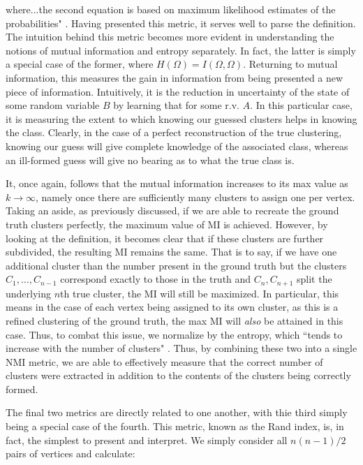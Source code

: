 \documentclass{article}
\begin{document}
where...the second equation is based on maximum likelihood estimates of the probabilities" \cite{evaluation}. Having presented this metric, it serves well to parse the definition. The intuition behind this metric becomes more evident in understanding the notions of mutual information and entropy separately. In fact, the latter is simply a special case of the former, where $H(\Omega) = I(\Omega,\Omega)$. Returning to mutual information, this measures the gain in information from being presented a new piece of information. Intuitively, it is the reduction in uncertainty of the state of some random variable $B$ by learning that for some r.v. $A$. In this particular case, it is measuring the extent to which knowing our guessed clusters helps in knowing the class. Clearly, in the case of a perfect reconstruction of the true clustering, knowing our guess will give complete knowledge of the associated class, whereas an ill-formed guess will give no bearing as to what the true class is.

It, once again, follows that the mutual information increases to its max value as $k\rightarrow\infty$, namely once there are sufficiently many clusters to assign one per vertex. Taking an aside, as previously discussed, if we are able to recreate the ground truth clusters perfectly, the maximum value of MI is achieved. However, by looking at the definition, it becomes clear that if these clusters are further subdivided, the resulting MI remains the same. That is to say, if we have one additional cluster than the number present in the ground truth but the clusters $C_1,\dots,C_{n-1}$ correspond exactly to those in the truth and $C_n,C_{n+1}$ split the underlying $n$th true cluster, the MI will still be maximized. In particular, this means in the case of each vertex being assigned to its own cluster, as this is a refined clustering of the ground truth, the max MI will \textit{also} be attained in this case. Thus, to combat this issue, we normalize by the entropy, which ``tends to increase with the number of clusters" \cite{evaluation}. Thus, by combining these two into a single NMI metric, we are able to effectively measure that the correct number of clusters were extracted in addition to the contents of the clusters being correctly formed.

The final two metrics are directly related to one another, with thie third simply being a special case of the fourth. This metric, known as the Rand index, is, in fact, the simplest to present and interpret. We simply consider all $n(n-1)/2$ pairs of vertices and calculate:
\end{document}
